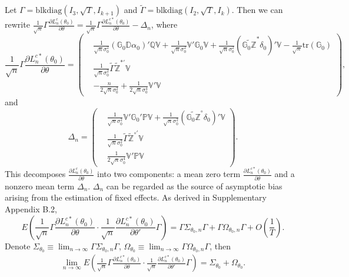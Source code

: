 \documentclass[11pt,a4paper]{article}
\begin{document}
Let $\Gamma=\mathrm{blkdiag}(I_3,\sqrt{T},I_{k+1})$ and $\widetilde{\Gamma}=\mathrm{blkdiag}(I_2,\sqrt{T},I_{k})$. Then we can rewrite $\frac{1}{\sqrt{n}}\Gamma\frac{\partial L_n^c(\theta_0)}{\partial\theta}=\frac{1}{\sqrt{n}}\Gamma\frac{\partial L_n^{c*}(\theta_0)}{\partial\theta}-\Delta_n$, where
$$\frac{1}{\sqrt{n}}\Gamma\frac{\partial L_n^{c*}(\theta_0)}{\partial\theta}=\left(\begin{aligned}
&\frac{1}{\sqrt{n}\sigma^2_0}(\mathbb{G}_0\mathbb{D\alpha}_0)'\mathbb{QV}+\frac{1}{\sqrt{n}\sigma_0^2}\mathbb{V}'\mathbb{G}_0\mathbb{V}+\frac{1}{\sqrt{n}\sigma_0^2}(\widetilde{\mathbb{G}_0\mathbb{Z}}^*\delta_0)'\mathbb{V}-\frac{1}{\sqrt{n}}\mathrm{tr}(\mathbb{G}_0)\\
&\frac{1}{\sqrt{n}\sigma_0^2}\widetilde{\Gamma}\widetilde{\mathbb{Z}}^{*\prime}\mathbb{V}\\
&-\frac{n}{2\sqrt{n}\sigma_0^2}+\frac{1}{2\sqrt{n}\sigma_0^4}\mathbb{V'V}
\end{aligned}\right),$$
and
$$\Delta_n=\left(\begin{aligned}
&\frac{1}{\sqrt{n}\sigma_0^2}\mathbb{V}'\mathbb{G}_0'\mathbb{P}\mathbb{V}+\frac{1}{\sqrt{n}\sigma_0^2}(\widetilde{\mathbb{G}_0\mathbb{Z}}^\circ\delta_0)'\mathbb{V}\\
&\frac{1}{\sqrt{n}\sigma_0^2}\widetilde{\Gamma}\widetilde{\mathbb{Z}}^{\circ\prime}\mathbb{V}\\
&\frac{1}{2\sqrt{n}\sigma_0^4}\mathbb{V'}\mathbb{P}\mathbb{V}
\end{aligned}\right).$$
This decomposes $\frac{\partial L_n^c(\theta_0)}{\partial\theta}$ into two components: a mean zero term $\frac{\partial L_n^{c*}(\theta_0)}{\partial\theta}$ and a nonzero mean term $\Delta_n$. $\Delta_n$ can be regarded as the source of asymptotic bias arising from the estimation of fixed effects.
As derived in Supplementary Appendix B.2, $$E\left(\frac{1}{\sqrt{n}}\Gamma\frac{\partial L_n^{c*}(\theta_0)}{\partial\theta}\cdot\frac{1}{\sqrt{n}}\frac{\partial L_n^{c*}(\theta_0)}{\partial\theta'}\Gamma\right)=\Gamma\Sigma_{\theta_0,n}\Gamma+\Gamma\Omega_{\theta_0,n}\Gamma+O\left(\frac{1}{T}\right).$$
Denote $\Sigma_{\theta_0}\equiv\lim_{n\rightarrow\infty}\Gamma\Sigma_{\theta_0,n}\Gamma$, $\Omega_{\theta_0}\equiv\lim_{n\rightarrow\infty}\Gamma\Omega_{\theta_0,n}\Gamma$, then
\begin{align}
\lim_{n\rightarrow\infty}E\left(\frac{1}{\sqrt{n}}\Gamma\frac{\partial L_n^{c*}(\theta_0)}{\partial\theta}\cdot\frac{1}{\sqrt{n}}\frac{\partial L_n^{c*}(\theta_0)}{\partial\theta'}\Gamma\right)=\Sigma_{\theta_0}+\Omega_{\theta_0}.\label{eq_varg}
\end{align}
\end{document}
